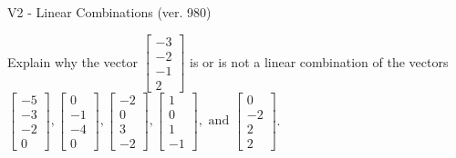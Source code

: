 \begin{exercise}
  \begin{exerciseTitle}V2 - Linear Combinations (ver. 980)\end{exerciseTitle}
  \begin{exerciseStatement}
    Explain why the vector \(\left[\begin{array}{c}
-3 \\
-2 \\
-1 \\
2
\end{array}\right]\)  is or is not a linear 
	combination of the vectors \(\left[\begin{array}{c}
-5 \\
-3 \\
-2 \\
0
\end{array}\right] , \left[\begin{array}{c}
0 \\
-1 \\
-4 \\
0
\end{array}\right] , \left[\begin{array}{c}
-2 \\
0 \\
3 \\
-2
\end{array}\right] , \left[\begin{array}{c}
1 \\
0 \\
1 \\
-1
\end{array}\right] , \text{ and } \left[\begin{array}{c}
0 \\
-2 \\
2 \\
2
\end{array}\right]\).
	



\end{exerciseStatement}
\end{exercise}
